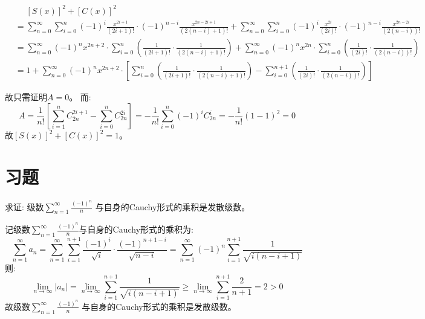 \begin{solution}
    \begin{align*}
        &\mathrel{\phantom{=}} [S(x)]^2+[C(x)]^2\\
        & = \sum_{n=0}^{\infty} \sum_{i=0}^{n} (-1)^{i}
        \frac{x^{2i+1}}{(2i+1)!} \cdot (-1)^{n-i}
        \frac{x^{2n-2i+1}}{(2(n-i)+1)!}
        + \sum_{n=0}^{\infty} \sum_{i=0}^{n} (-1)^{i}
        \frac{x^{2i}}{(2i)!} \cdot (-1)^{n-i} \frac{x^{2n -
        2i}}{(2(n-i))!}      \\
        & = \sum_{n=0}^{\infty} (-1)^n x^{2n+2} \cdot \sum_{i=0}^{n}
        \left( \frac{1}{(2i+1)!} \cdot \frac{1}{(2(n-i)+1)!} \right) +
        \sum_{n=0}^{\infty} (-1)^n x^{2n} \cdot \sum_{i=0}^{n}
        \left( \frac{1}{(2i)!} \cdot \frac{1}{(2(n-i))!} \right)
        \\
        & = 1 + \sum_{n=0}^{\infty} (-1)^n x^{2n+2}
        \cdot
        \left[ \sum_{i=0}^{n} \left( \frac{1}{(2i+1)!} \cdot
            \frac{1}{(2(n-i)+1)!} \right)
            - \sum_{i=0}^{n+1} \left( \frac{1}{(2i)!} \cdot
        \frac{1}{(2(n-i))!} \right) \right]
    \end{align*}

    故只需证明\(A=0\)。
    而:
    \[
        A=\frac{1}{n!}\left[ \sum_{i=1}^{n} C^{2i+1}_{2n} -
        \sum_{i=0}^{n} C^{2i}_{2n} \right] = - \frac{1}{n!}
        \sum_{i=0}^{n} (-1)^i C^{i}_{2n} =
        - \frac{1}{n!} \left( 1 - 1 \right)^2
        =0
    \]
    故\([S(x)]^2+[C(x)]^2=1\)。
\end{solution}
\section{习题}
\begin{problem}
    求证: 级数\(\sum_{n=1}^{\infty} \frac{(-1)^n}{n}\)
    与自身的Cauchy形式的乘积是发散级数。
\end{problem}

\begin{solution}
    记级数\(\sum_{n=1}^{\infty} \frac{(-1)^n}{n}\)与自身的Cauchy形式的乘积为:
    \[
        \sum_{n=1}^{\infty} a_n =
        \sum_{n=1}^{\infty} \sum_{i=1}^{n+1} \frac{(-1)^i}{\sqrt{i}}
        \cdot \frac{(-1)^{n+1-i}}{\sqrt{n-i}} =
        \sum_{n=1}^{\infty} (-1)^n \sum_{i=1}^{n+1}
        \frac{1}{\sqrt{i(n-i+1)}}
    \]
    则:
    \[
        \lim_{n \to \infty} \left\vert a_n \right\vert
        = \lim_{n \to \infty} \sum_{i=1}^{n+1}
        \frac{1}{\sqrt{i(n-i+1)}}
        \ge \lim_{n \to \infty} \sum_{i=1}^{n+1} \frac{2}{n+1} = 2
        > 0
    \]
    故级数\(\sum_{n=1}^{\infty} \frac{(-1)^n}{n}\) 与自身的Cauchy形式的乘积是发散级数。
\end{solution}

